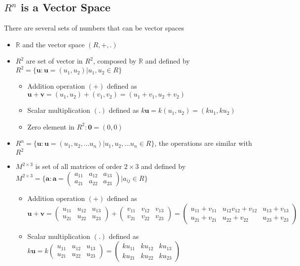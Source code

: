 \documentclass[a4paper,12pt]{article}
\begin{document}
\subsection*{\(R^n\) is a Vector Space}
There are several sets of numbers that can be vector spaces
\begin{itemize}
  \item \(\mathbb{R}\) and the vector space \((R, +, .)\)
  \item \(R^2\) are set of vector in \(R^2\), composed by \(\mathbb{R}\) and defined by \(R^2=\{\textbf{u}:\textbf{u}=(u_1, u_2)|u_1, u_2 \in R\}\) \begin{itemize}
          \item Addition operation \((+)\) defined as \(\textbf{u}+\textbf{v}=(u_1,u_2)+(v_1,v_2)=(u_1+v_1, u_2+v_2)\)
          \item Scalar multiplication \((.)\) defined as \(k\textbf{u}=k(u_1,u_2)=(ku_1,ku_2)\)
          \item Zero element in \(R^2:\textbf{0}=(0,0)\)
        \end{itemize}
  \item \(R^n=\{\textbf{u}:\textbf{u}=(u_1, u_2,\dots u_n)|u_1, u_2,\dots u_n \in R\}\), the operations are similar with \(R^2\)
  \item \(M^{2\times 3}\) is set of all matrices of order \(2\times 3\) and defined by \(M^{2\times 3}=\bigg\{\textbf{a}:\textbf{a}=\begin{pmatrix}a_{11}&a_{12}&a_{13}\\a_{21}&a_{22}&a_{23}\end{pmatrix}\bigg|a_{ij}\in R\bigg\}\) \begin{itemize}
          \item Addition operation \((+)\) defined as \(\textbf{u}+\textbf{v}=\begin{pmatrix}u_{11}&u_{12}&u_{13}\\u_{21}&u_{22}&u_{23}\end{pmatrix}+\begin{pmatrix}v_{11}&v_{12}&v_{13}\\v_{21}&v_{22}&v_{23}\end{pmatrix}=\begin{pmatrix}u_{11}+v_{11}&u_{12}v_{12}+v_{12}&u_{13}+v_{13}\\u_{21}+v_{21}&u_{22}+v_{22}&u_{23}+v_{23}\end{pmatrix}\)
          \item Scalar multiplication \((.)\) defined as \(k\textbf{u}=k\begin{pmatrix}u_{11}&u_{12}&u_{13}\\u_{21}&u_{22}&u_{23}\end{pmatrix}=\begin{pmatrix}ku_{11}&ku_{12}&ku_{13}\\ku_{21}&ku_{22}&ku_{23}\end{pmatrix}\)

\end{itemize}
\end{itemize}
\end{document}
